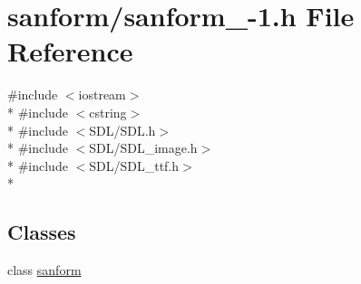 \hypertarget{sanform__1-1_8h}{}\section{sanform/sanform\+\_-\/1.h File Reference}
\label{sanform__1-1_8h}
{\ttfamily \#include $<$iostream$>$}\\*
{\ttfamily \#include $<$cstring$>$}\\*
{\ttfamily \#include $<$S\+D\+L/\+S\+D\+L.\+h$>$}\\*
{\ttfamily \#include $<$S\+D\+L/\+S\+D\+L\+\_\+image.\+h$>$}\\*
{\ttfamily \#include $<$S\+D\+L/\+S\+D\+L\+\_\+ttf.\+h$>$}\\*
\subsection*{Classes}
\begin{DoxyCompactItemize}
\item 
class \hyperlink{classsanform}{sanform}
\end{DoxyCompactItemize}
